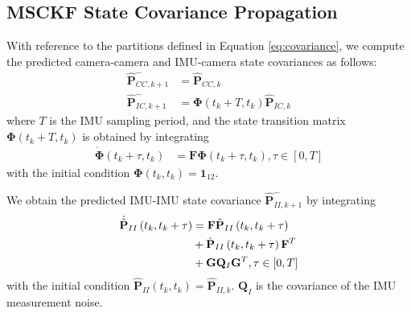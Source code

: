 \documentclass[letterpaper, 10 pt, conference]{ieeeconf}  %
\def\Vec#1{\mathbf{#1}}
\begin{document}
\subsection{MSCKF State Covariance Propagation}
With reference to the partitions defined in Equation \ref{eq:covariance}, we compute the predicted camera-camera and IMU-camera state covariances as follows:
\begin{align}
    \hat{\Vec{P}}^-_{CC,k+1} &= \hat{\Vec{P}}_{CC,k} \\
    \hat{\Vec{P}}^-_{IC,k+1} &= \boldsymbol{\Phi}\left(t_k + T, t_k \right) \hat{\Vec{P}}_{IC,k}
\end{align}
where $T$ is the IMU sampling period, and the state transition matrix $\boldsymbol{\Phi}\left(t_k + T, t_k \right)$ is obtained by integrating
\begin{align} \label{eq:statetransition}
    \dot{\boldsymbol{\Phi}}\left(t_k + \tau, t_k \right) &= \Vec{F} \boldsymbol{\Phi}\left(t_k + \tau, t_k \right), \tau\in\left[0,T\right]
\end{align}
with the initial condition $\boldsymbol{\Phi}\left(t_k, t_k \right) = \Vec{1}_{12}$.

We obtain the predicted IMU-IMU state covariance $\hat{\Vec{P}}^-_{II,k+1}$ by integrating
\begin{align} \label{eq:imucovar}
    \dot{\hat{\Vec{P}}}_{II}\left(t_k, t_k  + \tau \right) &= \Vec{F} \hat{\Vec{P}}_{II}\left(t_k, t_k  + \tau \right) \notag \\ 
                & + \hat{\Vec{P}}_{II}\left(t_k, t_k  + \tau \right) \Vec{F}^T \notag \\ 
                & + \Vec{G} \Vec{Q}_I \Vec{G}^T, \tau\in\left[0,T\right]
\end{align}
with the initial condition $\hat{\Vec{P}}_{II}\left(t_k, t_k\right) = \hat{\Vec{P}}_{II,k}$. 
$\Vec{Q}_I$ is the covariance of the IMU measurement noise.
\end{document}
